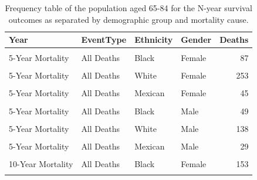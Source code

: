 \documentclass[
]{article}
\begin{document}
\begin{table}[!h]

\caption{\label{tab:DeathFreq2}Frequency table of the population aged 65-84 for the N-year survival outcomes as separated by demographic group and mortality cause.}
\centering
\begin{tabular}[t]{llllr}
\toprule
Year & EventType & Ethnicity & Gender & Deaths\\
\midrule
\cellcolor{gray!6}{5-Year Mortality} & \cellcolor{gray!6}{CVD} & \cellcolor{gray!6}{Black} & \cellcolor{gray!6}{Female} & \cellcolor{gray!6}{35}\\
5-Year Mortality & All Deaths & Black & Female & 87\\
\cellcolor{gray!6}{5-Year Mortality} & \cellcolor{gray!6}{CVD} & \cellcolor{gray!6}{White} & \cellcolor{gray!6}{Female} & \cellcolor{gray!6}{92}\\
5-Year Mortality & All Deaths & White & Female & 253\\
\cellcolor{gray!6}{5-Year Mortality} & \cellcolor{gray!6}{CVD} & \cellcolor{gray!6}{Mexican} & \cellcolor{gray!6}{Female} & \cellcolor{gray!6}{15}\\
5-Year Mortality & All Deaths & Mexican & Female & 45\\
\cellcolor{gray!6}{5-Year Mortality} & \cellcolor{gray!6}{CVD} & \cellcolor{gray!6}{Black} & \cellcolor{gray!6}{Male} & \cellcolor{gray!6}{19}\\
5-Year Mortality & All Deaths & Black & Male & 49\\
\cellcolor{gray!6}{5-Year Mortality} & \cellcolor{gray!6}{CVD} & \cellcolor{gray!6}{White} & \cellcolor{gray!6}{Male} & \cellcolor{gray!6}{55}\\
5-Year Mortality & All Deaths & White & Male & 138\\
\cellcolor{gray!6}{5-Year Mortality} & \cellcolor{gray!6}{CVD} & \cellcolor{gray!6}{Mexican} & \cellcolor{gray!6}{Male} & \cellcolor{gray!6}{10}\\
5-Year Mortality & All Deaths & Mexican & Male & 29\\
\addlinespace
\cellcolor{gray!6}{10-Year Mortality} & \cellcolor{gray!6}{CVD} & \cellcolor{gray!6}{Black} & \cellcolor{gray!6}{Female} & \cellcolor{gray!6}{56}\\
10-Year Mortality & All Deaths & Black & Female & 153\\
\cellcolor{gray!6}{10-Year Mortality} & \cellcolor{gray!6}{CVD} & \cellcolor{gray!6}{White} & \cellcolor{gray!6}{Female} & \cellcolor{gray!6}{187}\\

\end{tabular}
\end{table}
\end{document}
